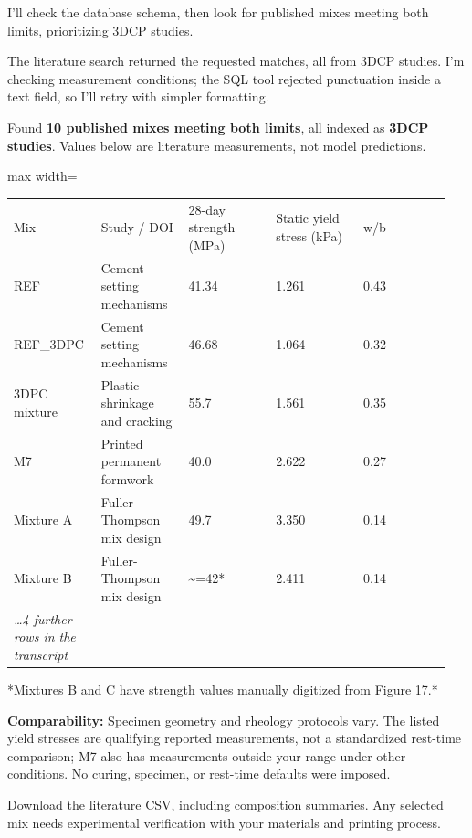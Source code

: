 \begin{agentbox}
I'll check the database schema, then look for published mixes meeting both limits, prioritizing 3DCP studies.\par
The literature search returned the requested matches, all from 3DCP studies. I'm checking measurement conditions; the SQL tool rejected punctuation inside a text field, so I'll retry with simpler formatting.\par
Found \textbf{10 published mixes meeting both limits}, all indexed as \textbf{3DCP studies}. Values below are literature measurements, not model predictions.\par
\par
\par\smallskip\begin{adjustbox}{max width=\linewidth}\begin{tabular}{p{0.19\linewidth}p{0.19\linewidth}p{0.19\linewidth}p{0.19\linewidth}p{0.19\linewidth}}
Mix & Study / DOI & 28-day strength (MPa) & Static yield stress (kPa) & w/b \\
REF & Cement setting mechanisms & 41.34 & 1.261 & 0.43 \\
REF\_3DPC & Cement setting mechanisms & 46.68 & 1.064 & 0.32 \\
3DPC mixture & Plastic shrinkage and cracking & 55.7 & 1.561 & 0.35 \\
M7 & Printed permanent formwork & 40.0 & 2.622 & 0.27 \\
Mixture A & Fuller-Thompson mix design & 49.7 & 3.350 & 0.14 \\
Mixture B & Fuller-Thompson mix design & \textasciitilde{}=42* & 2.411 & 0.14 \\
\multicolumn{1}{l}{\textit{\ldots 4 further rows in the transcript}} \\
\end{tabular}\end{adjustbox}\par\smallskip
\par
*Mixtures B and C have strength values manually digitized from Figure 17.*\par
\par
\textbf{Comparability:} Specimen geometry and rheology protocols vary. The listed yield stresses are qualifying reported measurements, not a standardized rest-time comparison; M7 also has measurements outside your range under other conditions. No curing, specimen, or rest-time defaults were imposed.\par
\par
Download the literature CSV, including composition summaries. Any selected mix needs experimental verification with your materials and printing process.\par
\par
\end{agentbox}